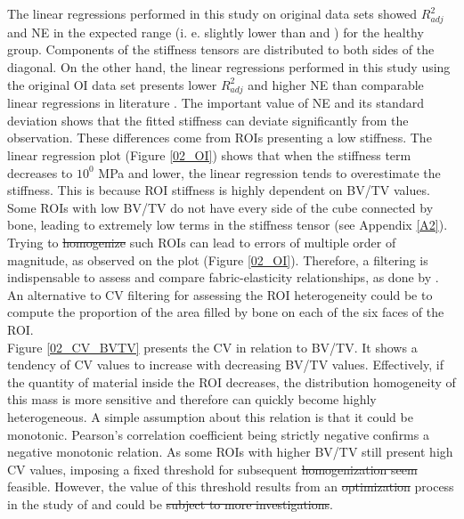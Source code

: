 \documentclass[a4paper,fleqn]{DC_ArtStyle}
\providecommand{\DIFadd}[1]{{\protect\color{blue}{#1}}} %
\providecommand{\DIFdel}[1]{{\protect\color{red}\sout{#1}}}                      %
\providecommand{\DIFaddbegin}{} %
\providecommand{\DIFaddend}{} %
\providecommand{\DIFdelbegin}{} %
\providecommand{\DIFdelend}{} %
\begin{document}
\DIFdelend The linear regressions performed in this study on original data sets showed $R^2_{adj}$ and NE in the expected range (i. e. slightly lower than \citeauthor{Gross2013}\cite{Gross2013} and \citeauthor{Panyasantisuk2015}\cite{Panyasantisuk2015}) for the healthy group. Components of the stiffness tensors are distributed to both sides of the diagonal. On the other hand, the linear regressions performed in this study using the original OI data set presents lower $R^2_{adj}$ and higher NE than comparable linear regressions in literature \cite{Gross2013,Panyasantisuk2015}. The important value of NE and its standard deviation shows that the fitted stiffness can deviate significantly from the observation. These differences come from ROIs presenting a low stiffness. The linear regression plot (Figure \ref{02_OI}) shows that when the stiffness term decreases to $10^0$ MPa and lower, the linear regression tends to overestimate the stiffness. This is because ROI stiffness is highly dependent on BV/TV values. Some ROIs with low BV/TV do not have every side of the cube connected by bone, leading to extremely low terms in the stiffness tensor (see Appendix \ref{A2}). Trying to \DIFdelbegin \DIFdel{homogenize }\DIFdelend \DIFaddbegin \DIFadd{homogenise }\DIFaddend such ROIs can lead to errors of multiple order of magnitude, as observed on the plot (Figure \ref{02_OI}). Therefore, a filtering is indispensable to assess and compare fabric-elasticity relationships, as done by \citeauthor{Panyasantisuk2015} \cite{Panyasantisuk2015}. An alternative to CV filtering for assessing the ROI heterogeneity could be to compute the proportion of the area filled by bone on each of the six faces of the ROI. \\
\DIFdelbegin %

\DIFdelend Figure \ref{02_CV_BVTV} presents the CV in relation to BV/TV. It shows a tendency of CV values to increase with decreasing BV/TV values. Effectively, if the quantity of material inside the ROI decreases, the distribution homogeneity of this mass is more sensitive and therefore can quickly become highly heterogeneous. A simple assumption about this relation is that it could be monotonic. Pearson's correlation coefficient being strictly negative confirms a negative monotonic relation. As some ROIs with higher BV/TV still present high CV values, imposing a fixed threshold for subsequent \DIFdelbegin \DIFdel{homogenization seem }\DIFdelend \DIFaddbegin \DIFadd{homogenisation seems }\DIFaddend feasible. However, the value of this threshold results from an \DIFdelbegin \DIFdel{optimization }\DIFdelend \DIFaddbegin \DIFadd{optimisation }\DIFaddend process in the study of \citeauthor{Panyasantisuk2015}\cite{Panyasantisuk2015} and could be \DIFdelbegin \DIFdel{subject to more investigations}\DIFdelend \DIFaddbegin \DIFadd{investigated further}\DIFaddend . \\
\DIFdelbegin %
\end{document}
